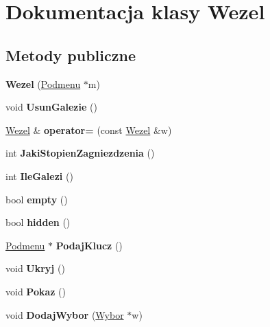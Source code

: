 \hypertarget{classWezel}{\section{Dokumentacja klasy Wezel}
\label{classWezel}
}
\subsection*{Metody publiczne}
\begin{DoxyCompactItemize}
\item 
\hypertarget{classWezel_a475536dfa2fdef22c03214a41da9aefb}{{\bfseries Wezel} (\hyperlink{classPodmenu}{Podmenu} $\ast$m)}\label{classWezel_a475536dfa2fdef22c03214a41da9aefb}

\item 
\hypertarget{classWezel_afcd2e556ccadbd4c76380a0291bf2d92}{void {\bfseries Usun\-Galezie} ()}\label{classWezel_afcd2e556ccadbd4c76380a0291bf2d92}

\item 
\hypertarget{classWezel_a42faeaf03f6a074426ce4573e30bd219}{\hyperlink{classWezel}{Wezel} \& {\bfseries operator=} (const \hyperlink{classWezel}{Wezel} \&w)}\label{classWezel_a42faeaf03f6a074426ce4573e30bd219}

\item 
\hypertarget{classWezel_a688d09d7d6ebdbcee5d9e60aeac40c9a}{int {\bfseries Jaki\-Stopien\-Zagniezdzenia} ()}\label{classWezel_a688d09d7d6ebdbcee5d9e60aeac40c9a}

\item 
\hypertarget{classWezel_adc0a12c31b7f16559b592d3a35cc21cb}{int {\bfseries Ile\-Galezi} ()}\label{classWezel_adc0a12c31b7f16559b592d3a35cc21cb}

\item 
\hypertarget{classWezel_a34f917480e08a1d9a9018cb0a4a7fffb}{bool {\bfseries empty} ()}\label{classWezel_a34f917480e08a1d9a9018cb0a4a7fffb}

\item 
\hypertarget{classWezel_a973ff795099e9104f639af4d7afed5b1}{bool {\bfseries hidden} ()}\label{classWezel_a973ff795099e9104f639af4d7afed5b1}

\item 
\hypertarget{classWezel_ad9bc3f0c370709984d1b5d20bc69f48a}{\hyperlink{classPodmenu}{Podmenu} $\ast$ {\bfseries Podaj\-Klucz} ()}\label{classWezel_ad9bc3f0c370709984d1b5d20bc69f48a}

\item 
\hypertarget{classWezel_a807dbf5bc0381900ef5ed47a64a26459}{void {\bfseries Ukryj} ()}\label{classWezel_a807dbf5bc0381900ef5ed47a64a26459}

\item 
\hypertarget{classWezel_a193764263bbe6e41dd471359b6c399fe}{void {\bfseries Pokaz} ()}\label{classWezel_a193764263bbe6e41dd471359b6c399fe}

\item 
\hypertarget{classWezel_a99f760ec710167d40dacc70157d8409e}{void {\bfseries Dodaj\-Wybor} (\hyperlink{classWybor}{Wybor} $\ast$w)}\label{classWezel_a99f760ec710167d40dacc70157d8409e}

\end{DoxyCompactItemize}
